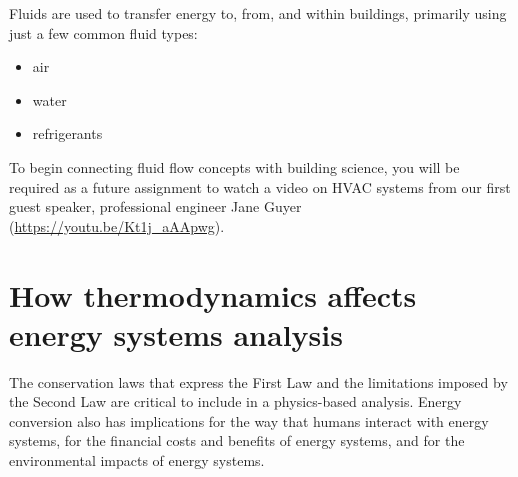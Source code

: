 \documentclass[10pt]{article}
\begin{document}
Fluids are used to transfer energy to, from, and within buildings, primarily using just a few common fluid types:

\begin{itemize}[noitemsep]%
\item air
\item water 
\item refrigerants
\end{itemize}

To begin connecting fluid flow concepts with building science, you will be required as a future assignment to watch a video on HVAC systems from our first guest speaker, professional engineer Jane Guyer  (\url{https://youtu.be/Kt1j_aAApwg}).


\section{How thermodynamics affects energy systems analysis}

The conservation laws that express the First Law and the limitations imposed by the Second Law are critical to include in a physics-based analysis. Energy conversion also has implications for the way that humans interact with energy systems, for the financial costs and benefits of energy systems, and for the environmental impacts of energy systems.







\end{document}
